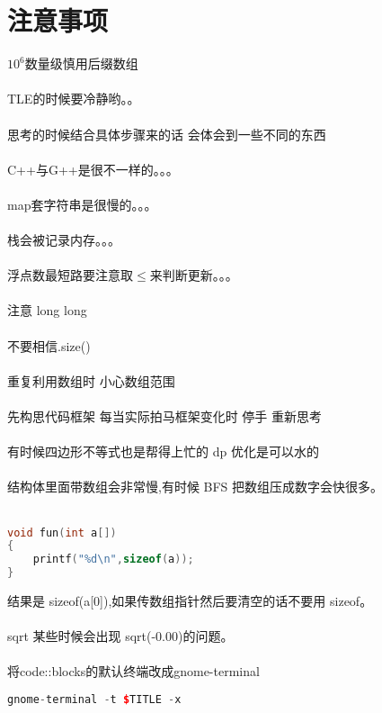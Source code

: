 \section{注意事项}
    $10^{6}$数量级慎用后缀数组\\
    \\
    TLE的时候要冷静哟。。\\
    \\
    思考的时候结合具体步骤来的话 会体会到一些不同的东西\\
    \\
    C++与G++是很不一样的。。。\\
    \\
    map套字符串是很慢的。。。\\ 
    \\
    栈会被记录内存。。。\\
    \\
    浮点数最短路要注意取$\leq$来判断更新。。。\\
    \\
    注意 long long\\
    \\
    不要相信.size()\\
    \\
    重复利用数组时 小心数组范围\\
    \\
    先构思代码框架 每当实际拍马框架变化时 停手 重新思考\\
    \\
    有时候四边形不等式也是帮得上忙的 dp 优化是可以水的\\
    \\
    结构体里面带数组会非常慢,有时候 BFS 把数组压成数字会快很多。\\
    \\
    \begin{lstlisting}[language=c++]
void fun(int a[])
{
    printf("%d\n",sizeof(a));
}
    \end{lstlisting}
    结果是 sizeof(a[0]),如果传数组指针然后要清空的话不要用 sizeof。\\
    \\
    sqrt 某些时候会出现 sqrt(-0.00)的问题。\\
    \\
    将code::blocks的默认终端改成gnome-terminal
    \begin{lstlisting}[language=c++]
gnome-terminal -t $TITLE -x
    \end{lstlisting}
